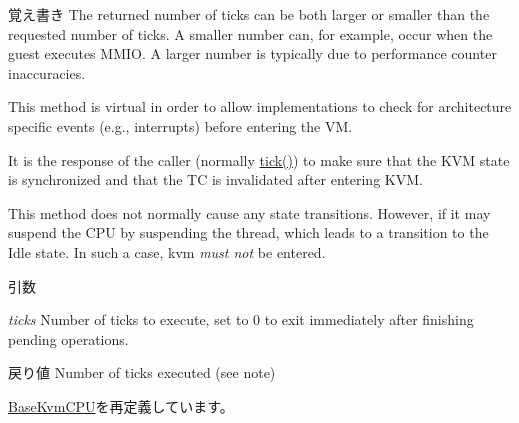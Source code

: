 \begin{DoxyNote}{覚え書き}
The returned number of ticks can be both larger or smaller than the requested number of ticks. A smaller number can, for example, occur when the guest executes MMIO. A larger number is typically due to performance counter inaccuracies.

This method is virtual in order to allow implementations to check for architecture specific events (e.g., interrupts) before entering the VM.

It is the response of the caller (normally \hyperlink{classBaseKvmCPU_a873dd91783f9efb4a590aded1f70d6b0}{tick()}) to make sure that the KVM state is synchronized and that the TC is invalidated after entering KVM.

This method does not normally cause any state transitions. However, if it may suspend the CPU by suspending the thread, which leads to a transition to the Idle state. In such a case, kvm {\itshape must not\/} be entered.
\end{DoxyNote}

\begin{DoxyParams}{引数}
\item[{\em ticks}]Number of ticks to execute, set to 0 to exit immediately after finishing pending operations. \end{DoxyParams}
\begin{DoxyReturn}{戻り値}
Number of ticks executed (see note) 
\end{DoxyReturn}


\hyperlink{classBaseKvmCPU_aed3dbd0c0bf26d82ee56367a3f350506}{BaseKvmCPU}を再定義しています。


